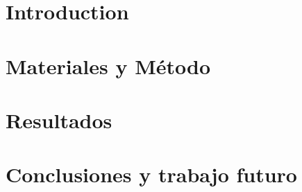 \documentclass[runningheads,a4paper]{llncs}
\begin{document}
\section{Introduction}




\section{Materiales y Método}


\section{Resultados}


\section{Conclusiones y trabajo futuro}





\end{document}
